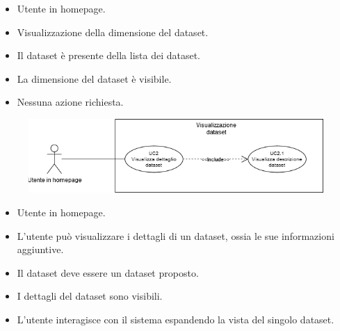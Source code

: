     \UCdsc
    { %
        \begin{itemize}
            \item Utente in homepage.
        \end{itemize}
    }
    { %
        \begin{itemize}
            \item Visualizzazione della dimensione del dataset.
        \end{itemize}
    }
    { %
        \begin{itemize}
            \item Il dataset è presente della lista dei dataset.
        \end{itemize}
    }
    { %
        \begin{itemize}
            \item La dimensione del dataset è visibile.
        \end{itemize}
    }
    { %
        \begin{itemize}
            \item Nessuna azione richiesta.
        \end{itemize}
    }


    \begin{figure}[h!]
        \centering
        \includegraphics[scale=0.6]{template/images/UC2.png}
        \caption{}
    \end{figure}
    \UCdsc
    { %
        \begin{itemize}
            \item Utente in homepage.
        \end{itemize}
    }
    { %
        \begin{itemize}
            \item L'utente può visualizzare i dettagli di un dataset, ossia le sue informazioni aggiuntive.
        \end{itemize}
    }
    { %
        \begin{itemize}
            \item Il dataset deve essere un dataset proposto.
        \end{itemize}
    }
    { %
        \begin{itemize}
            \item I dettagli del dataset sono visibili.
        \end{itemize}
    }
    { %
        \begin{itemize}
            \item L'utente interagisce con il sistema espandendo la vista del singolo dataset.
        \end{itemize}
    }
    

